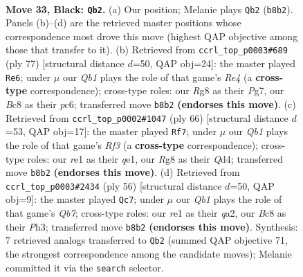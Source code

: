 \documentclass[11pt]{article}
\begin{document}
\clearpage

\begin{figure}[p]\centering
\begin{subfigure}{0.46\textwidth}\centering
\resizebox{\linewidth}{!}{%
\newchessgame
\chessboard[
  setfen={1qb2kr1/p4p2/2B4p/2P1p1p1/8/8/P7/3KR3 b - - 0 33},
  showmover=false,
  pgfstyle=straightmove, color=movearrow, markmove={b8-b2}
]}
\caption{}
\end{subfigure}\hfill
\begin{subfigure}{0.46\textwidth}\centering
\resizebox{\linewidth}{!}{%
\newchessgame
\chessboard[
  setfen={6k1/6p1/p1P5/1p1pr1pP/8/2P5/P7/3K2R1 b - - 0 39},
  showmover=false,
  pgfstyle=straightmove, color=movearrow, markmove={e5-e6}
]}
\caption{}
\end{subfigure}
\\[4pt]
\begin{subfigure}{0.46\textwidth}\centering
\resizebox{\linewidth}{!}{%
\newchessgame
\chessboard[
  setfen={1r4k1/4p2p/p3P1p1/3P4/3Q4/3K1R1P/2P5/4q3 w - - 1 34},
  showmover=false,
  pgfstyle=straightmove, color=movearrow, markmove={f3-f7}
]}
\caption{}
\end{subfigure}\hfill
\begin{subfigure}{0.46\textwidth}\centering
\resizebox{\linewidth}{!}{%
\newchessgame
\chessboard[
  setfen={3r2k1/1Q3pp1/7p/2p5/5P2/1P5P/q5P1/6RK w - - 0 29},
  showmover=false,
  pgfstyle=straightmove, color=movearrow, markmove={b7-c7}
]}
\caption{}
\end{subfigure}
\caption{\textbf{Move 33, Black: \texttt{Qb2}.} (a) Our position; Melanie plays \texttt{Qb2} (\texttt{b8b2}). Panels (b)--(d) are the retrieved master positions whose correspondence most drove this move (highest QAP objective among those that transfer to it). (b) Retrieved from \texttt{ccrl\_top\_p0003\#689} (ply 77) [structural distance $d$=50, QAP obj=24]: the master played \texttt{Re6}; under $\mu$ our \emph{Qb1} plays the role of that game's \emph{Re4} (a \textbf{cross-type} correspondence); cross-type roles: our \emph{R}g8 as their \emph{P}g7, our \emph{B}c8 as their \emph{p}c6; transferred move \texttt{b8b2} \textbf{(endorses this move)}. (c) Retrieved from \texttt{ccrl\_top\_p0002\#1047} (ply 66) [structural distance $d$=53, QAP obj=17]: the master played \texttt{Rf7}; under $\mu$ our \emph{Qb1} plays the role of that game's \emph{Rf3} (a \textbf{cross-type} correspondence); cross-type roles: our \emph{r}e1 as their \emph{q}e1, our \emph{R}g8 as their \emph{Q}d4; transferred move \texttt{b8b2} \textbf{(endorses this move)}. (d) Retrieved from \texttt{ccrl\_top\_p0003\#2434} (ply 56) [structural distance $d$=50, QAP obj=9]: the master played \texttt{Qc7}; under $\mu$ our \emph{Qb1} plays the role of that game's \emph{Qb7}; cross-type roles: our \emph{r}e1 as their \emph{q}a2, our \emph{B}c8 as their \emph{P}h3; transferred move \texttt{b8b2} \textbf{(endorses this move)}. Synthesis: 7 retrieved analogs transferred to \texttt{Qb2} (summed QAP objective 71, the strongest correspondence among the candidate moves); Melanie committed it via the \texttt{search} selector.}
\label{fig:thought-m65}
\end{figure}
\end{document}
